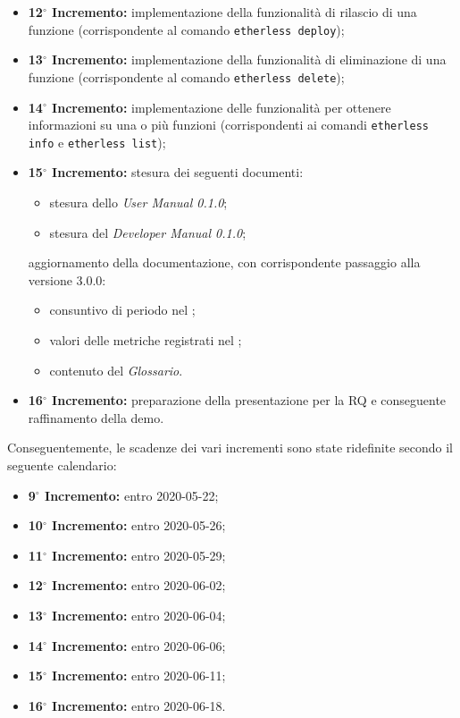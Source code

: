 \begin{itemize}
	\item \textbf{12$^{\circ}$ Incremento:} implementazione della funzionalità di rilascio di una funzione (corrispondente al comando \texttt{etherless deploy});
	\item \textbf{13$^{\circ}$ Incremento:} implementazione della funzionalità di eliminazione di una funzione (corrispondente al comando \texttt{etherless delete});
	\item \textbf{14$^{\circ}$ Incremento:} implementazione delle funzionalità per ottenere informazioni su una o più funzioni (corrispondenti ai comandi \texttt{etherless info} e \texttt{etherless list});
	\item \textbf{15$^{\circ}$ Incremento:} stesura dei seguenti documenti: 
	\begin{itemize}
		\item stesura dello \textit{User Manual 0.1.0}; 
		\item stesura del \textit{Developer Manual 0.1.0}; 
	\end{itemize}
	aggiornamento della documentazione, con corrispondente passaggio alla versione 3.0.0:  
	\begin{itemize}
		\item consuntivo di periodo nel \textit{\PdP{}}; 
		\item valori delle metriche registrati nel \textit{\PdQ{}}; 
		\item contenuto del \textit{Glossario}.  
	\end{itemize}
	\item \textbf{16$^{\circ}$ Incremento:} preparazione della presentazione per la RQ e conseguente raffinamento della demo.
\end{itemize}

Conseguentemente, le scadenze dei vari incrementi sono state ridefinite secondo il seguente calendario:
\begin{itemize}
	\item \textbf{9$^{\circ}$ Incremento:} entro 2020-05-22;
	\item \textbf{10$^{\circ}$ Incremento:} entro 2020-05-26;
	\item \textbf{11$^{\circ}$ Incremento:} entro 2020-05-29;
	\item \textbf{12$^{\circ}$ Incremento:} entro 2020-06-02;
	\item \textbf{13$^{\circ}$ Incremento:} entro 2020-06-04;
	\item \textbf{14$^{\circ}$ Incremento:} entro 2020-06-06;
	\item \textbf{15$^{\circ}$ Incremento:} entro 2020-06-11;
	\item \textbf{16$^{\circ}$ Incremento:} entro 2020-06-18.
\end{itemize}

